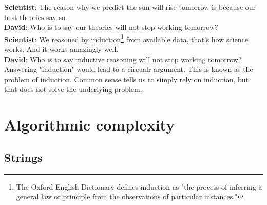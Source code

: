 {\setlength\parindent{0pt}
\textbf{Scientist}: The reason why we predict the sun will rise tomorrow is because our best theories say so.  \\

\textbf{David}: Who is to say our theories will not stop working tomorrow?  \\

\textbf{Scientist}: We reasoned by induction\footnote{The Oxford English Dictionary defines induction as "the process of inferring a general law or principle from the observations of particular instances."} from available data, that's how science works. And it works amazingly well.  \\

\textbf{David}: Who is to say inductive reasoning will not stop working tomorrow?  \\

Answering "induction" would lead to a circualr argument.
This is known as the problem of induction.
Common sense tells us to simply rely on induction, but that does not solve the underlying problem.
}

\newpage

\section{Algorithmic complexity}

\subsection{Strings}

